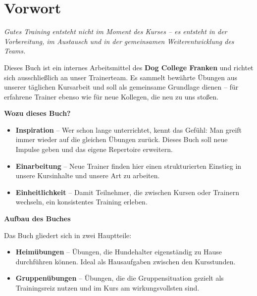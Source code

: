 \chapter*{Vorwort}

\begin{tcolorbox}[colback=infobg, colframe=primary, arc=6pt, boxrule=0.8pt,
                  left=10pt, right=10pt, top=10pt, bottom=10pt]
  \faQuoteLeft\quad\textit{Gutes Training entsteht nicht im Moment des Kurses –
  es entsteht in der Vorbereitung, im Austausch und in der gemeinsamen
  Weiterentwicklung des Teams.}
\end{tcolorbox}

\bigskip

Dieses Buch ist ein internes Arbeitsmittel des \textbf{Dog College Franken}
und richtet sich ausschließlich an unser Trainerteam. Es sammelt bewährte
Übungen aus unserer täglichen Kursarbeit und soll als gemeinsame Grundlage
dienen – für erfahrene Trainer ebenso wie für neue Kollegen, die neu zu
uns stoßen.

\bigskip

\textbf{Wozu dieses Buch?}

\begin{itemize}[leftmargin=2em, itemsep=6pt]
  \item[\faLightbulb] \textbf{Inspiration} – Wer schon lange unterrichtet,
    kennt das Gefühl: Man greift immer wieder auf die gleichen Übungen zurück.
    Dieses Buch soll neue Impulse geben und das eigene Repertoire erweitern.
  \item[\faUserTie] \textbf{Einarbeitung} – Neue Trainer finden hier einen
    strukturierten Einstieg in unsere Kursinhalte und unsere Art zu arbeiten.
  \item[\faUsers] \textbf{Einheitlichkeit} – Damit Teilnehmer, die zwischen
    Kursen oder Trainern wechseln, ein konsistentes Training erleben.
\end{itemize}

\bigskip

\textbf{Aufbau des Buches}

Das Buch gliedert sich in zwei Hauptteile:

\begin{itemize}[leftmargin=2em, itemsep=6pt]
  \item[\faHome] \textbf{Heimübungen} – Übungen, die Hundehalter eigenständig
    zu Hause durchführen können. Ideal als Hausaufgaben zwischen den Kursstunden.
  \item[\faUsers] \textbf{Gruppenübungen} – Übungen, die die Gruppensituation
    gezielt als Trainingsreiz nutzen und im Kurs am wirkungsvollsten sind.
\end{itemize}

